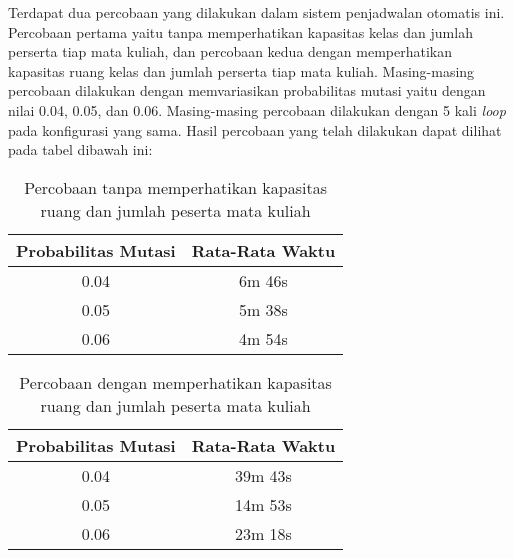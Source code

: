 Terdapat dua percobaan yang dilakukan dalam sistem penjadwalan otomatis ini. Percobaan pertama yaitu tanpa memperhatikan kapasitas kelas dan jumlah perserta tiap mata kuliah, dan percobaan kedua dengan memperhatikan kapasitas ruang kelas dan jumlah perserta tiap mata kuliah.
Masing-masing percobaan dilakukan dengan memvariasikan probabilitas mutasi yaitu dengan nilai 0.04, 0.05, dan 0.06.
Masing-masing percobaan dilakukan dengan 5 kali \emph{loop} pada konfigurasi yang sama. 
Hasil percobaan yang telah dilakukan dapat dilihat pada tabel dibawah ini:
\begin{longtable}{|c|c|}
  \caption{Percobaan tanpa memperhatikan kapasitas \linebreak ruang dan jumlah peserta mata kuliah}
  \label{tab:tanpaKapasitas}\\
  \hline
  \rowcolor[HTML]{C0C0C0} 
{\color[HTML]{000000} \textbf{Probabilitas Mutasi}} & {\color[HTML]{000000} \textbf{Rata-Rata Waktu}} \\ \hline
0.04                                                & 6m 46s                                           \\ \hline
0.05                                                & 5m 38s                                           \\ \hline
0.06                                                & 4m 54s                                           \\ \hline
\end{longtable}

\begin{longtable}{|c|c|}
  \caption{Percobaan dengan memperhatikan kapasitas \linebreak ruang dan jumlah peserta mata kuliah}
  \label{tab:denganKapasitas}\\
  \hline
  \rowcolor[HTML]{C0C0C0} 
{\color[HTML]{000000} \textbf{Probabilitas Mutasi}} & {\color[HTML]{000000} \textbf{Rata-Rata Waktu}} \\ \hline
0.04                                                & 39m 43s                                         \\ \hline
0.05                                                & 14m 53s                                         \\ \hline
0.06                                                & 23m 18s                                         \\ \hline
\end{longtable}


